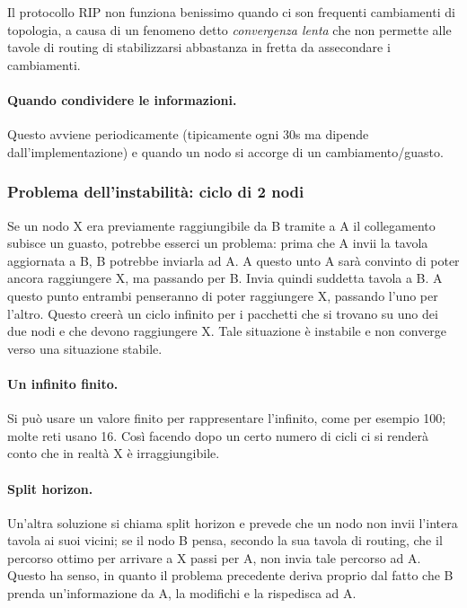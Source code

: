             Il protocollo RIP non funziona benissimo quando ci son frequenti cambiamenti di topologia, a causa di un fenomeno detto \textit{convergenza lenta} che non permette alle tavole di routing di stabilizzarsi abbastanza in fretta da assecondare i cambiamenti.
            
        \paragraph{Quando condividere le informazioni.}
            Questo avviene periodicamente (tipicamente ogni 30s ma dipende dall'implementazione) e quando un nodo si accorge di un cambiamento/guasto.
            
        \subsubsection{Problema dell'instabilità: ciclo di 2 nodi}
            Se un nodo X era previamente raggiungibile da B tramite a A il collegamento subisce un guasto, potrebbe esserci un problema: prima che A invii la tavola aggiornata a B, B potrebbe inviarla ad A. A questo unto A sarà convinto di poter ancora raggiungere X, ma passando per B. Invia quindi suddetta tavola a B. A questo punto entrambi penseranno di poter raggiungere X, passando l'uno per l'altro. Questo creerà un ciclo infinito per i pacchetti che si trovano su uno dei due nodi e che devono raggiungere X. Tale situazione è instabile e non converge verso una situazione stabile.
            
            \paragraph{Un infinito finito.} Si può usare un valore finito per rappresentare l'infinito, come per esempio 100; molte reti usano 16. Così facendo dopo un certo numero di cicli ci si renderà conto che in realtà X è irraggiungibile.
            
            \paragraph{Split horizon.} Un'altra soluzione si chiama split horizon e prevede che un nodo non invii l'intera tavola ai suoi vicini; se il nodo B pensa, secondo la sua tavola di routing, che il percorso ottimo per arrivare a X passi per A, non invia tale percorso ad A. Questo ha senso, in quanto il problema precedente deriva proprio dal fatto che B prenda un'informazione da A, la modifichi e la rispedisca ad A.
            
